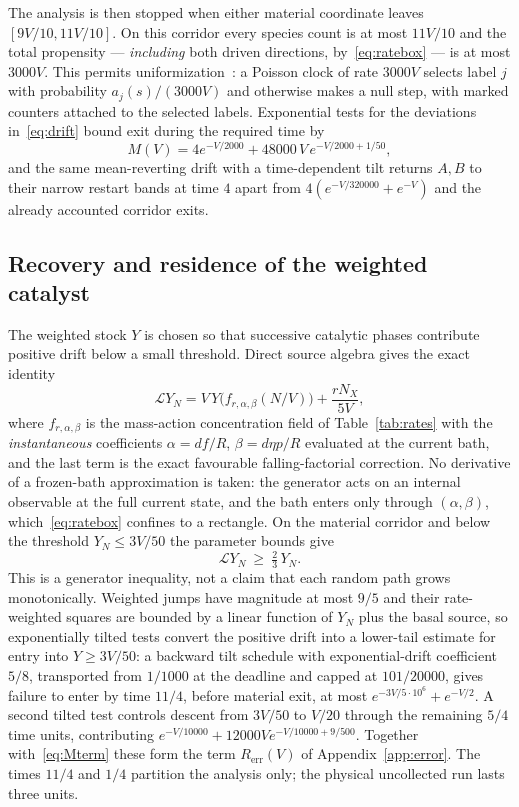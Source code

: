 \documentclass[11pt,a4paper]{article}
\theoremstyle{plain}
\theoremstyle{definition}
\theoremstyle{remark}
\newcommand{\Lgen}{\mathcal L}
\begin{document}
The analysis is then stopped when either material coordinate leaves $[9V/10,11V/10]$. On this corridor every species count is at most $11V/10$ and the total propensity --- \emph{including} both driven directions, by~\eqref{eq:ratebox} --- is at most $3000V$. This permits uniformization~\citep{jensen1953,grassmann1977}: a Poisson clock of rate $3000V$ selects label $j$ with probability $a_j(s)/(3000V)$ and otherwise makes a null step, with marked counters attached to the selected labels. Exponential tests for the deviations in~\eqref{eq:drift} bound exit during the required time by
\begin{equation}\label{eq:Mterm}
M(V)=4e^{-V/2000}+48000\,V\,e^{-V/2000+1/50},
\end{equation}
and the same mean-reverting drift with a time-dependent tilt returns $A,B$ to their narrow restart bands at time $4$ apart from $4(e^{-V/320000}+e^{-V})$ and the already accounted corridor exits.

\subsection{Recovery and residence of the weighted catalyst}\label{sec:recovery}

The weighted stock $Y$ is chosen so that successive catalytic phases contribute positive drift below a small threshold. Direct source algebra gives the exact identity
\begin{equation}\label{eq:Ydrift}
\Lgen Y_N=V\,Y\bigl(f_{r,\alpha,\beta}(N/V)\bigr)+\frac{rN_X}{5V},
\end{equation}
where $f_{r,\alpha,\beta}$ is the mass-action concentration field of Table~\ref{tab:rates} with the \emph{instantaneous} coefficients $\alpha=df/R$, $\beta=d\eta p/R$ evaluated at the current bath, and the last term is the exact favourable falling-factorial correction. No derivative of a frozen-bath approximation is taken: the generator acts on an internal observable at the full current state, and the bath enters only through $(\alpha,\beta)$, which~\eqref{eq:ratebox} confines to a rectangle. On the material corridor and below the threshold $Y_N\le3V/50$ the parameter bounds give
\begin{equation}\label{eq:Ypositive}
\Lgen Y_N\ \ge\ \tfrac23\,Y_N .
\end{equation}
This is a generator inequality, not a claim that each random path grows monotonically. Weighted jumps have magnitude at most $9/5$ and their rate-weighted squares are bounded by a linear function of $Y_N$ plus the basal source, so exponentially tilted tests convert the positive drift into a lower-tail estimate for entry into $Y\ge3V/50$: a backward tilt schedule with exponential-drift coefficient $5/8$, transported from $1/1000$ at the deadline and capped at $101/20000$, gives failure to enter by time $11/4$, before material exit, at most $e^{-3V/5\cdot10^6}+e^{-V/2}$. A second tilted test controls descent from $3V/50$ to $V/20$ through the remaining $5/4$ time units, contributing $e^{-V/10000}+12000Ve^{-V/10000+9/500}$. Together with~\eqref{eq:Mterm} these form the term $R_{\mathrm{err}}(V)$ of Appendix~\ref{app:error}. The times $11/4$ and $1/4$ partition the analysis only; the physical uncollected run lasts three units.
\end{document}

